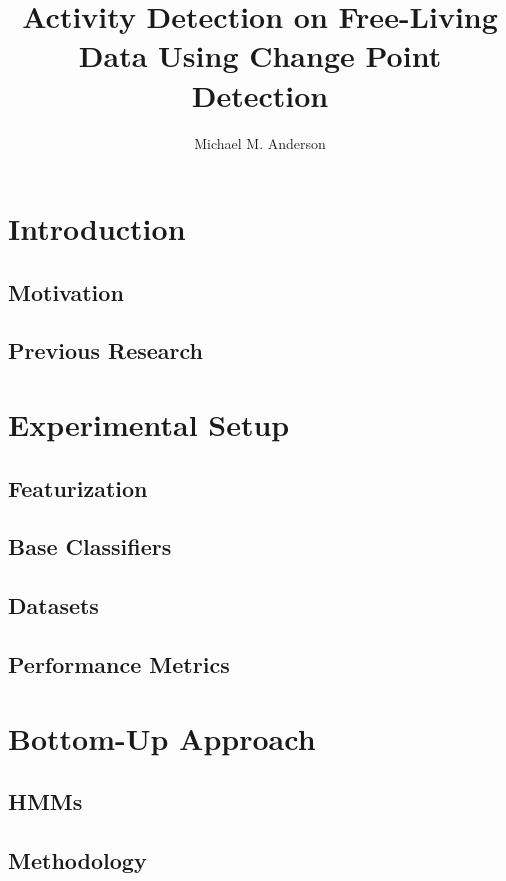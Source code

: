 \documentclass[onehalf,11pt]{beavtex}
\title{Activity Detection on Free-Living Data Using Change Point Detection}
\author{Michael M. Anderson}
\begin{document}
\maketitle
\mainmatter


\chapter{Introduction}
\section{Motivation}
\section{Previous Research}

\chapter{Experimental Setup}
\section{Featurization}
\section{Base Classifiers}
\section{Datasets}
\section{Performance Metrics}





\chapter{Bottom-Up Approach}
\section{HMMs}
\section{Methodology}
\end{document}
